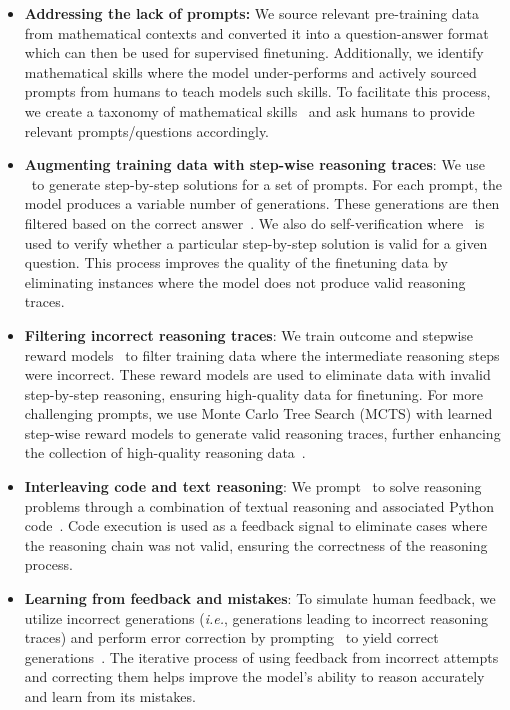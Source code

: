 \documentclass[dvipsnames]{fairmeta}
\begin{document}
\begin{itemize}
    \item \textbf{Addressing the lack of prompts:} We source relevant pre-training data from mathematical contexts and converted it into a question-answer format which can then be used for supervised finetuning. Additionally, we identify mathematical skills where the model under-performs and actively sourced prompts from humans to teach models such skills. To facilitate this process, we create a taxonomy of mathematical skills~\citep{didolkar2024metacognitive} and ask humans to provide relevant prompts/questions accordingly.
    \item \textbf{Augmenting training data with step-wise reasoning traces}: We use \llamathree~to generate step-by-step solutions for a set of prompts. For each prompt, the model produces a variable number of generations. These generations are then filtered based on the correct answer~\citep{li2024common}. We also do self-verification where \llamathree~is used to verify whether a particular step-by-step solution is valid for a given question. This process improves the quality of the finetuning data by eliminating instances where the model does not produce valid reasoning traces.
    \item \textbf{Filtering incorrect reasoning traces}:  We train outcome and stepwise reward models~\citep{lightman2023let, wang2023math} to filter training data where the intermediate reasoning steps were incorrect. These reward models are used to eliminate data with invalid step-by-step reasoning, ensuring high-quality data for finetuning. For more challenging prompts, we use Monte Carlo Tree Search (MCTS) with learned step-wise reward models to generate valid reasoning traces, further enhancing the collection of high-quality reasoning data~\citep{xie2024monte}.
    \item \textbf{Interleaving code and text reasoning}:  We prompt \llamathree~to solve reasoning problems through a combination of textual reasoning and associated Python code~\citep{gou2023tora}. Code execution is used as a feedback signal to eliminate cases where the reasoning chain was not valid, ensuring the correctness of the reasoning process.
    \item \textbf{Learning from feedback and mistakes}: To simulate human feedback, we utilize incorrect generations (\emph{i.e.}, generations leading to incorrect reasoning traces) and perform error correction by prompting \llamathree~to yield correct generations~\citep{an2023learning, welleck2022generating, madaan2024self}. The iterative process of using feedback from incorrect attempts and correcting them helps improve the model's ability to reason accurately and learn from its mistakes.
\end{itemize}
\end{document}
